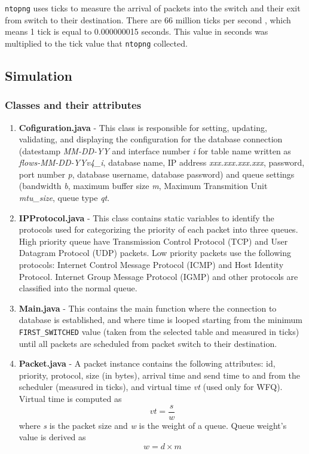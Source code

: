 \documentclass[journal]{IEEE/IEEEtran}
\begin{document}
\texttt{ntopng} uses ticks to measure the arrival of packets into the switch and their exit from switch to their destination. There are 66 million ticks per second \cite{webopedia_2017}, which means 1 tick is equal to 0.000000015 seconds. This value in seconds was multiplied to the tick value that \texttt{ntopng} collected.

\subsection{Simulation}
\subsubsection{Classes and their attributes}
\begin{enumerate}
\item \textbf{Cofiguration.java} - This class is responsible for setting, updating, validating, and displaying the configuration for the database connection (datestamp \textit{MM-DD-YY} and interface number \textit{i} for table name written as \textit{flows-MM-DD-YYv4\_i}, database name, IP address \textit{xxx.xxx.xxx.xxx}, password, port number \textit{p}, database username, database password) and queue settings (bandwidth \textit{b}, maximum buffer size \textit{m}, Maximum Transmition Unit \textit{mtu\_size}, queue type \textit{qt}.

\item \textbf{IPProtocol.java} - This class contains static variables to identify the protocols used for categorizing the priority of each packet into three queues. High priority queue have Transmission Control Protocol (TCP) and User Datagram Protocol (UDP) packets. Low priority packets use the following protocols: Internet Control Message Protocol (ICMP) and Host Identity Protocol. Internet Group Message Protocol (IGMP) and other protocols are classified into the normal queue.

\item \textbf{Main.java} - This contains the main function where the connection to database is established, and where time is looped starting from the minimum \texttt{FIRST\_SWITCHED} value (taken from the selected table and measured in ticks) until all packets are scheduled from packet switch to their destination.

\item \textbf{Packet.java} - A packet instance contains the following attributes: id, priority, protocol, size (in bytes), arrival time and send time to and from the scheduler (measured in ticks), and virtual time \textit{vt} (used only for WFQ).  Virtual time is computed as
\[
    vt = \frac{s}{w}
\]
where \textit{s} is the packet size and \textit{w} is the weight of a queue. Queue weight's value is derived as
\[
	w = d \times m
\]


\end{enumerate}
\end{document}
